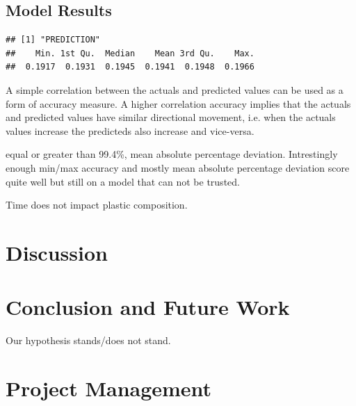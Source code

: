 \documentclass[10pt]{article}\usepackage[]{graphicx}\usepackage[]{color}
\makeatletter
\newenvironment{kframe}{%
 \def\at@end@of@kframe{}%
 \ifinner\ifhmode%
  \def\at@end@of@kframe{\end{minipage}}%
  \begin{minipage}{\columnwidth}%
 \fi\fi%
 \def\FrameCommand##1{\hskip\@totalleftmargin \hskip-\fboxsep
 \colorbox{shadecolor}{##1}\hskip-\fboxsep
     \hskip-\linewidth \hskip-\@totalleftmargin \hskip\columnwidth}%
 \MakeFramed {\advance\hsize-\width
   \@totalleftmargin\z@ \linewidth\hsize
   \@setminipage}}%
 {\par\unskip\endMakeFramed%
 \at@end@of@kframe}
\newenvironment{knitrout}{}{} %
\makeatother
\begin{document}
\subsection{Model Results}

\begin{knitrout}
\color{fgcolor}\begin{kframe}
\begin{verbatim}
## [1] "PREDICTION"
##    Min. 1st Qu.  Median    Mean 3rd Qu.    Max. 
##  0.1917  0.1931  0.1945  0.1941  0.1948  0.1966
\end{verbatim}


{\ttfamily\noindent\bfseries{}}\end{kframe}
\end{knitrout}

A simple correlation between the actuals and predicted values can be used as a form of accuracy measure. A higher correlation accuracy implies that the actuals and predicted values have similar directional movement, i.e. when the actuals values increase the predicteds also increase and vice-versa.

equal or greater than 99.4\%, mean absolute percentage deviation.
Intrestingly enough min/max accuracy and mostly mean absolute percentage deviation score quite well but still on a model that can not be trusted.

Time does not impact plastic composition.



\pagebreak
\section{Discussion}



\section{Conclusion and Future Work}\label{cdsmote1}

Our hypothesis stands/does not stand.






\pagebreak
\section{Project Management}\label{mgt}
\end{document}
